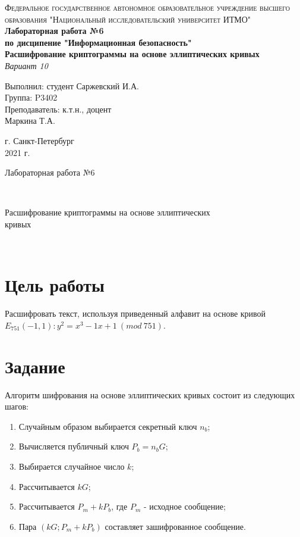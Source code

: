 \documentclass[12pt, a4paper]{article}
\begin{document}
\begin{titlepage}
\begin{center}

\textsc{Федеральное государственное автономное образовательное учреждение высшего\\
образования "Национальный исследовательский университет ИТМО"}
\vfill
\textbf{Лабораторная работа №6\\[4mm]
по дисципение "Информационная безопасность"\\[4mm]
Расшифрование криптограммы на основе эллиптических кривых\\[4mm]
}
\textit{Вариант 10\\[20mm]}
\begin{flushright}
Выполнил: студент Саржевский И.А.
\\[2mm]Группа: P3402\\[4mm]
Преподаватель: к.т.н., доцент\\
Маркина Т.А.
\end{flushright}
\vfill
г. Санкт-Петербург\\[2mm]
2021 г.

\end{center}
\end{titlepage}

\begin{huge}Лабораторная работа №6\end{huge}\\[4mm]
\begin{Large}Расшифрование криптограммы на основе эллиптических\\кривых\end{Large}\\

\section*{Цель работы}

Расшифровать текст, используя приведенный алфавит на основе кривой
$E_{751}(-1,1): y^2=x^3-1x+1\:(mod\:751)$.

\section*{Задание}

Алгоритм шифрования на основе эллиптических кривых состоит из следующих шагов:

\begin{enumerate}
  \item Случайным образом выбирается секретный ключ $n_b$;
  \item Вычисляется публичный ключ $P_b = n_bG$;
  \item Выбирается случайное число $k$;
  \item Рассчитывается $kG$;
  \item Рассчитывается $P_m + kP_b$, где $P_m$ - исходное сообщение;
  \item Пара $(kG; P_m + kP_b)$ составляет зашифрованное сообщение.
\end{enumerate}
\end{document}
